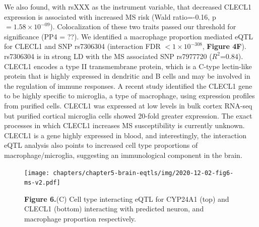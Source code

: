 {{We also found, with rsXXX as the instrument variable, that decreased CLECL1 expression is associated with increased MS risk (Wald ratio=-0.16, p$= 1.58 \times 10^{-09}$). Colocalization of these two traits passed our threshold for significance (PP4 = ??). We identified a macrophage proportion mediated eQTL for CLECL1 and SNP rs7306304 (interaction FDR $< 1 \times 10^{-308}$, \textbf{Figure 4F}). rs7306304 is in strong LD with the MS associated SNP rs7977720 ($R^2$=0.84)\cite{consortium*+MultipleSclerosisGenomic2019}. CLECL1 encodes a type II transmembrane protein, which is a C-type lectin-like protein that is highly expressed in dendritic and B cells and may be involved in the regulation of immune responses\cite{vanluijnMultipleSclerosisassociatedCLEC16A2015}. A recent study identified the CLECL1 gene to be highly specific to microglia, a type of macrophage, using expression profiles from purified cells. CLECL1 was expressed at low levels in bulk cortex RNA-seq but purified cortical microglia cells showed 20-fold greater expression\cite{vanluijnMultipleSclerosisassociatedCLEC16A2015}. The exact processes in which CLECL1 increases MS susceptibility is currently unknown. CLECL1 is a gene highly expressed in blood, and interestingly, the interaction eQTL analysis also points to increased cell type proportions of macrophage/microglia, suggesting an immunological component in the brain.  

\begin{figure}[H]
	\texttt{[image: chapters/chapter5-brain-eqtls/img/2020-12-02-fig6-ms-v2.pdf]}
	\caption{\textbf{Figure 6.}(C) Cell type interacting eQTL for CYP24A1 (top) and CLECL1 (bottom) interacting with predicted neuron, and macrophage proportion respectively. }
\end{figure}

}}
